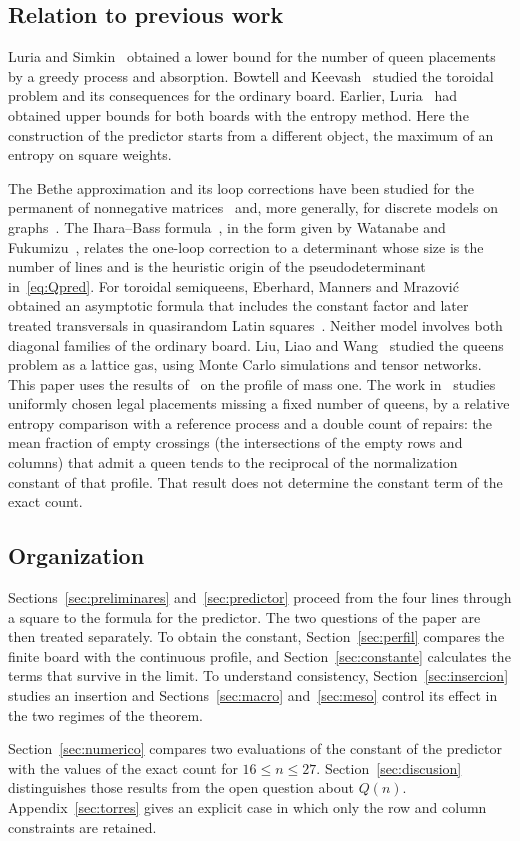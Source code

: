 \subsection*{Relation to previous work}

Luria and Simkin~\cite{LS} obtained a lower bound for the number of queen placements by a greedy
process and absorption. Bowtell and Keevash~\cite{BK} studied the toroidal problem and its
consequences for the ordinary board. Earlier, Luria~\cite{Luria} had obtained upper bounds for both
boards with the entropy method. Here the construction of the predictor starts from a
different object, the maximum of an entropy on square weights.

The Bethe approximation and its loop corrections have been studied for the permanent of
nonnegative matrices~\cite{Vontobel,WC} and, more generally, for discrete models on graphs~\cite{CC,WF,YFW}.
The Ihara--Bass formula~\cite{Bass}, in the form given by Watanabe and Fukumizu~\cite{WF}, relates the
one-loop correction to a determinant whose size is the number of lines and is the heuristic
origin of the pseudodeterminant in~\eqref{eq:Qpred}.
For toroidal semiqueens, Eberhard, Manners and Mrazović~\cite{EMM19} obtained an asymptotic
formula that includes the constant factor and later treated transversals in quasirandom
Latin squares~\cite{EMM}. Neither model involves both diagonal families of the ordinary board.
Liu, Liao and Wang~\cite{LLW} studied the queens problem as a lattice gas, using Monte Carlo
simulations and tensor networks.
This paper uses the results of~\cite{Perfil} on the profile of mass one. The work in~\cite{Completabilidad}
studies uniformly chosen legal placements missing a fixed number of queens, by a relative
entropy comparison with a reference process and a double count of repairs: the mean
fraction of empty crossings (the intersections of the empty rows and columns) that admit
a queen tends to the reciprocal of the normalization constant of that profile. That result
does not determine the constant term of the exact count.

\subsection*{Organization}

Sections~\ref{sec:preliminares} and~\ref{sec:predictor} proceed from the four lines through a square to the
formula for the
predictor. The two questions of the paper are then treated separately. To obtain the constant,
Section~\ref{sec:perfil} compares the finite board with the continuous profile, and
Section~\ref{sec:constante}
calculates the terms that survive in the limit. To understand consistency, Section~\ref{sec:insercion}
studies an insertion and Sections~\ref{sec:macro} and~\ref{sec:meso} control its effect in the two regimes
of the theorem.

Section~\ref{sec:numerico} compares two evaluations of the constant of the predictor with the values of the
exact count for $16\le n\le27$. Section~\ref{sec:discusion} distinguishes those results from the open
question about
$Q(n)$. Appendix~\ref{sec:torres} gives an explicit case in which only the row and column constraints are
retained.
